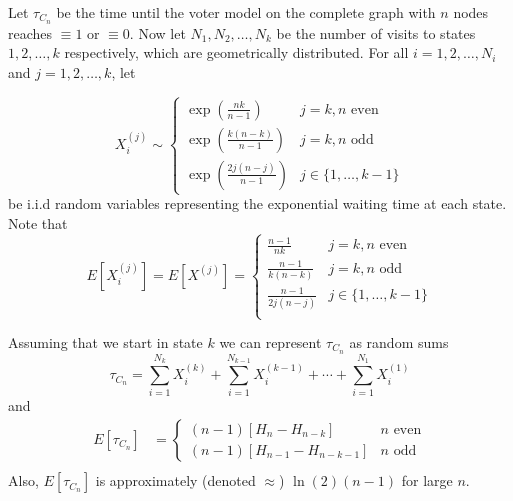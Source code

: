 \begin{theorem}
Let $\tau_{C_n}$ be the time until the voter model on the complete graph with $n$ nodes reaches $\equiv 1$ or $\equiv 0$.
Now let $N_1, N_2, \ldots, N_k$ be the number of visits to states $1, 2, \ldots, k$ respectively, which are geometrically distributed.
For all $i = 1,2,\ldots, N_i$ and $j = 1,2,\ldots, k$, let

$$
X_i^{(j)} \sim \begin{cases}
  \exp\left(\displaystyle \frac{nk}{n - 1}\right) & j = k, n \text{ even}\\[10pt]
  \exp\left(\displaystyle\frac{k (n - k)}{n - 1}\right) & j = k, n \text{ odd}\\[10pt]
  \exp\left(\displaystyle \frac{2j (n - j)}{n - 1}\right) & j \in \{1, \ldots, k-1\}
\end{cases}
$$
be i.i.d random variables representing the exponential waiting time at each state. Note that
$$
E[X_i^{(j)}] = E[X^{(j)}] = \begin{cases}
  \displaystyle \frac{n - 1}{nk} & j = k, n \text{ even}\\[10pt]
  \displaystyle \frac{n - 1}{k (n - k)} & j = k, n \text{ odd}\\[10pt]
  \displaystyle \frac{n - 1}{2j (n - j)} & j \in \{1,\ldots, k - 1\}\\
\end{cases}
$$

\noindent Assuming that we start in state $k$ we can represent $\tau_{C_n}$ as random sums
\begin{equation}\label{eq:wait_contact_sum_voter}
    \tau_{C_n} = \sum_{i = 1}^{N_k} X_i^{(k)} + \sum_{i = 1}^{N_{k - 1}} X_i^{(k - 1)} + \cdots + \sum_{i = 1}^{N_1} X_i^{(1)}
\end{equation}
and
\begin{align*}
E[\tau_{C_n}] &= \begin{cases}
    (n - 1) \left[H_{n} - H_{n - k}\right] & n \text{ even}\\
    (n - 1) \left[H_{n - 1} - H_{n - k - 1}\right] & n \text{ odd}
\end{cases}\\
\end{align*}
Also, $E[\tau_{C_n}]$ is approximately (denoted $\approx$) $\ln(2) (n - 1)$ for large $n$.
\end{theorem}

